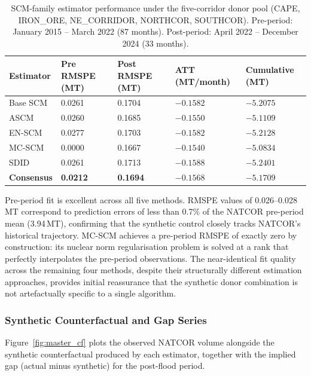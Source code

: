 \begin{table}[H]
  \centering
  \caption{SCM-family estimator performance under the five-corridor
           donor pool (CAPE, IRON\_ORE, NE\_CORRIDOR, NORTHCOR,
           SOUTHCOR). Pre-period: January 2015 -- March 2022
           (87 months). Post-period: April 2022 -- December 2024
           (33 months).}
  \label{tab:5donor}
  \begin{tabularx}{\textwidth}{lXXXX}
    \toprule
    Estimator & Pre RMSPE (MT) & Post RMSPE (MT)
              & ATT (MT/month) & Cumulative (MT) \\
    \midrule
    Base SCM  & 0.0261 & 0.1704 & $-0.1582$ & $-5.2075$ \\
    ASCM      & 0.0260 & 0.1685 & $-0.1550$ & $-5.1109$ \\
    EN-SCM    & 0.0277 & 0.1703 & $-0.1582$ & $-5.2128$ \\
    MC-SCM    & 0.0000 & 0.1667 & $-0.1540$ & $-5.0834$ \\
    SDID      & 0.0261 & 0.1713 & $-0.1588$ & $-5.2401$ \\
    \midrule
    \textbf{Consensus}
              & \textbf{0.0212} & \textbf{0.1694}
              & $\mathbf{-0.1568}$ & $\mathbf{-5.1709}$ \\
    \bottomrule
  \end{tabularx}
\end{table}

Pre-period fit is excellent across all five methods.
RMSPE values of 0.026--0.028\,MT correspond to prediction errors of
less than 0.7\% of the NATCOR pre-period mean (3.94\,MT), confirming
that the synthetic control closely tracks NATCOR's historical
trajectory.
MC-SCM achieves a pre-period RMSPE of exactly zero by construction:
its nuclear norm regularisation problem is solved at a rank that
perfectly interpolates the pre-period observations.
The near-identical fit quality across the remaining four methods,
despite their structurally different estimation approaches, provides
initial reassurance that the synthetic donor combination is not
artefactually specific to a single algorithm.

\subsubsection{Synthetic Counterfactual and Gap Series}

Figure~\ref{fig:master_cf} plots the observed NATCOR volume alongside
the synthetic counterfactual produced by each estimator, together with
the implied gap (actual minus synthetic) for the post-flood period.

